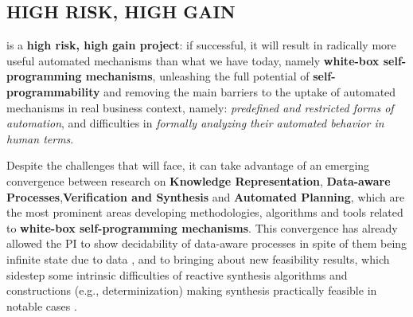 \vspace{-1ex}
\subsection*{HIGH RISK, HIGH GAIN}

\vspace{-1ex}

\project is a \textbf{high risk, high gain project}: if successful, it
will result in radically more useful automated mechanisms than what
we have today, namely \textbf{white-box self-programming mechanisms},
unleashing the full potential of \textbf{self-programmability} and
removing the main barriers to the uptake of automated mechanisms in
real business context, namely: \textit{predefined and restricted forms of automation}, and
difficulties in \textit{formally analyzing their automated behavior in human terms}.

Despite the challenges that \project will face, 
it can take advantage of an emerging convergence between research on
\textbf{Knowledge Representation}, \textbf{Data-aware
  Processes},\textbf{Verification and Synthesis } and
\textbf{Automated Planning}, which are the most prominent areas developing
methodologies, algorithms and tools related to \textbf{white-box
  self-programming mechanisms}. This convergence has already allowed
the PI to show decidability of data-aware processes in spite of them
being infinite state due to data \cite{HaririCGDM13,DeGLP16,CDMP17}, and to bringing about new
feasibility results, which sidestep some intrinsic difficulties of
reactive synthesis algorithms and constructions (e.g.,
determinization) making synthesis practically feasible in notable
cases \cite{DeVa13,DeVa15,DeVa16}.



